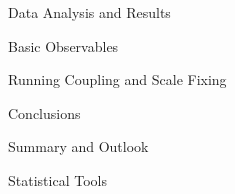 \documentclass[twoside,english, a4paper, 11pt]{shared/uiofysmaster}
\begin{document}
\begin{part}{Data Analysis and Results}
	\label{part:results}
	\begin{chapter}{Basic Observables}
  		\label{chap:obs_results}
  		
	\end{chapter}

	\begin{chapter}{Running Coupling and Scale Fixing}
		\label{chap:advance_results}
		
  	\end{chapter}
\end{part}
 
\begin{part}{Conclusions}
	\label{part:conclusion}
	\begin{chapter}{Summary and Outlook}
		\label{chap:conclusion}
		
	\end{chapter}
	\clearpage
\end{part}


\begin{appendices}
	
	\begin{chapter}{Statistical Tools}
		\label{appendix:resampling}
		
	\end{chapter}
\end{appendices}

%
\printbibliography

 
 
\end{document}
